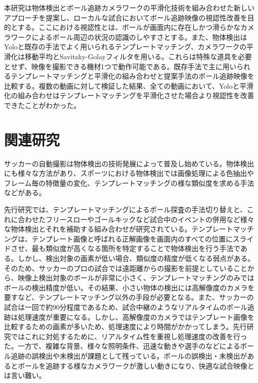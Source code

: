 \documentclass[11pt,a4j]{jreport}
\begin{document}
本研究は物体検出とボール追跡カメラワークの平滑化技術を組み合わせた新しいアプローチを提案し、ローカルな試合においてボール追跡映像の視認性改善を目的とする。ここにおける視認性とは、ボールが画面内に存在しかつ滑らかなカメラワークによるボール周辺の状況の認識のしやすさとする。また、物体検出はYoloと既存の手法でよく用いられるテンプレートマッチング、カメラワークの平滑化は移動平均とSavitzky-Golayフィルタを用いる。これらは特殊な道具を必要とせず、映像を撮影できる機材1つで動作可能である。既存手法で主に用いられるテンプレートマッチングと平滑化の組み合わせと提案手法のボール追跡映像を比較する。複数の動画に対して検証した結果、全ての動画において、Yoloと平滑化の組み合わせはテンプレートマッチングを平滑化させた場合より視認性を改善できたことがわかった。


\chapter{関連研究}

サッカーの自動撮影は物体検出の技術発展によって普及し始めている。物体検出にも様々な方法があり、スポーツにおける物体検出では画像処理による色抽出やフレーム毎の特徴量の変化\cite{携帯}、テンプレートマッチングの様な類似度を求める手法\cite{切り替えシステム}などがある。

\noindent
先行研究では、テンプレートマッチングによるボール探査の手法切り替え\cite{切り替えシステム}と、これに合わせたフリースローやゴールキックなど試合中のイベントの併用など様々な物体検出とそれを補助する組み合わせが研究されている。テンプレートマッチングは、テンプレート画像と呼ばれる正解画像を画面内のすべての位置にスライドさせ、最も類似度が高くなる箇所を特定することで物体検出を行う手法である。しかし、検出対象の画素が低い場合、類似度の精度が低くなる弱点がある。\cite{高解像度}そのため、サッカーのプロの試合では遠距離からの撮影を前提としていることから、映像上検出対象のボールが非常に小さく、テンプレートマッチングのみではボールの検出精度が低い。その結果、小さい物体の検出には高解像度のカメラを要すなど、テンプレートマッチング以外の手段が必要となる。また、サッカーの試合は一回で約90分程度であるため、試合中継のようなリアルタイムのボール追跡は処理速度が重要になる。しかし、高解像度のカメラではテンプレート画像を比較するための画素が多いため、処理速度により時間がかかってしまう。先行研究ではこれに対処するために、リアルタイム性を重視し処理速度の改善を行った。一方で、複雑な背景、様々な照明条件、迅速な動きや選手のなどによるボール追跡の誤検出や未検出が課題として残っている。ボールの誤検出・未検出があるとボールを追跡する様なカメラワークが激しい動きになり、快適な試合映像とは言い難い。
\end{document}
